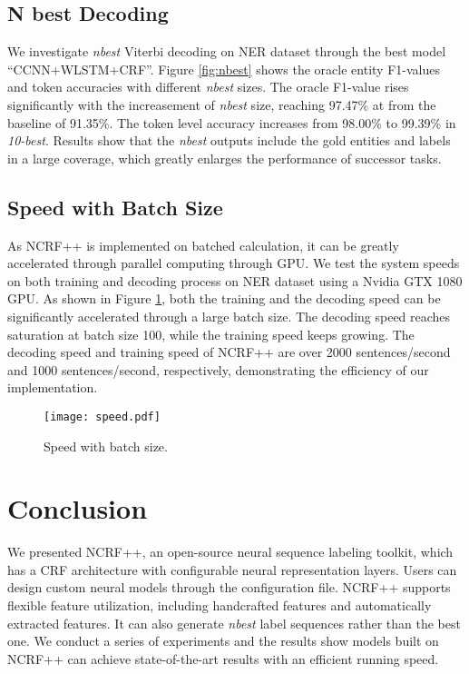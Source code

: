 \documentclass[11pt,a4paper]{article}
\begin{document}
\subsection{N best Decoding}
We investigate \textit{nbest} Viterbi decoding on NER dataset through the best model ``CCNN+WLSTM+CRF''. Figure \ref{fig:nbest} shows the oracle entity F1-values and token accuracies with different \textit{nbest} sizes. The oracle F1-value rises significantly with the increasement of \textit{nbest} size, reaching 97.47\% at  from the baseline of 91.35\%. The token level accuracy increases from 98.00\% to 99.39\% in \textit{10-best}. Results show that the \textit{nbest} outputs include the gold entities and labels in a large coverage, which greatly enlarges the performance of successor tasks.



\subsection{Speed with Batch Size}
As NCRF++ is implemented on batched calculation, it can be greatly accelerated through parallel computing through GPU. We test the system speeds on both training and decoding process on NER dataset using a Nvidia GTX 1080 GPU. As shown in Figure \ref{fig:speed}, both the training and the decoding speed can be significantly accelerated through a large batch size. The decoding speed reaches saturation at batch size 100, while the training speed keeps growing. The decoding speed and training speed of NCRF++ are over 2000 sentences/second and 1000 sentences/second, respectively, demonstrating the efficiency of our implementation.

\begin{figure}[!t]
  \centering 
    \texttt{[image: speed.pdf]}
  \caption{Speed with batch size.} 
  \label{fig:speed} \end{figure}



\section{Conclusion}
We presented NCRF++, an open-source neural sequence labeling toolkit, which has a CRF architecture with configurable neural representation layers. Users can design custom neural models through the configuration file. NCRF++ supports flexible feature utilization, including handcrafted features and automatically extracted features. It can also generate \textit{nbest} label sequences rather than the best one. We conduct a series of experiments and the results show models built on NCRF++ can achieve state-of-the-art results with an efficient running speed. 





\newpage


\end{document}
